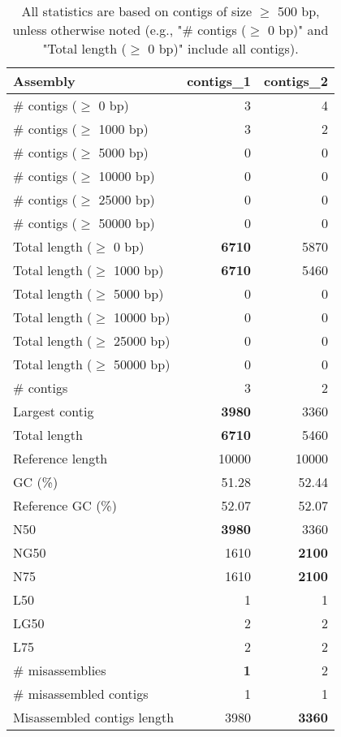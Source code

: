 \documentclass[12pt,a4paper]{article}
\begin{document}
\begin{table}[ht]
\begin{center}
\caption{All statistics are based on contigs of size $\geq$ 500 bp, unless otherwise noted (e.g., "\# contigs ($\geq$ 0 bp)" and "Total length ($\geq$ 0 bp)" include all contigs).}
\begin{tabular}{|l*{2}{|r}|}
\hline
Assembly & contigs\_1 & contigs\_2 \\ \hline
\# contigs ($\geq$ 0 bp) & 3 & 4 \\ \hline
\# contigs ($\geq$ 1000 bp) & 3 & 2 \\ \hline
\# contigs ($\geq$ 5000 bp) & 0 & 0 \\ \hline
\# contigs ($\geq$ 10000 bp) & 0 & 0 \\ \hline
\# contigs ($\geq$ 25000 bp) & 0 & 0 \\ \hline
\# contigs ($\geq$ 50000 bp) & 0 & 0 \\ \hline
Total length ($\geq$ 0 bp) & {\bf 6710} & 5870 \\ \hline
Total length ($\geq$ 1000 bp) & {\bf 6710} & 5460 \\ \hline
Total length ($\geq$ 5000 bp) & 0 & 0 \\ \hline
Total length ($\geq$ 10000 bp) & 0 & 0 \\ \hline
Total length ($\geq$ 25000 bp) & 0 & 0 \\ \hline
Total length ($\geq$ 50000 bp) & 0 & 0 \\ \hline
\# contigs & 3 & 2 \\ \hline
Largest contig & {\bf 3980} & 3360 \\ \hline
Total length & {\bf 6710} & 5460 \\ \hline
Reference length & 10000 & 10000 \\ \hline
GC (\%) & 51.28 & 52.44 \\ \hline
Reference GC (\%) & 52.07 & 52.07 \\ \hline
N50 & {\bf 3980} & 3360 \\ \hline
NG50 & 1610 & {\bf 2100} \\ \hline
N75 & 1610 & {\bf 2100} \\ \hline
L50 & 1 & 1 \\ \hline
LG50 & 2 & 2 \\ \hline
L75 & 2 & 2 \\ \hline
\# misassemblies & {\bf 1} & 2 \\ \hline
\# misassembled contigs & 1 & 1 \\ \hline
Misassembled contigs length & 3980 & {\bf 3360} \\ \hline

\end{tabular}
\end{center}
\end{table}
\end{document}
